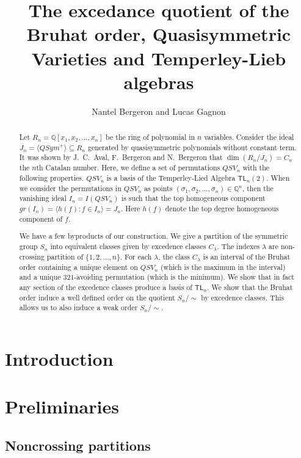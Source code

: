 \documentclass[12pt]{amsart}
\title{The excedance quotient of the Bruhat order, Quasisymmetric Varieties and Temperley-Lieb algebras}
\author{ Nantel Bergeron and Lucas Gagnon}
\date{}
\theoremstyle{definition}
\theoremstyle{remark}
\numberwithin{equation}{section}
\newcommand{\QQ}{\mathbb{Q}}
\newcommand{\TL}{\mathsf{TL}}
\begin{document}
\maketitle
\begin{abstract} Let $R_n=\QQ[x_1,x_2,\ldots,x_n]$ be the ring of polynomial in $n$ variables. Consider the ideal $J_n=\langle QSym^+\rangle\subseteq R_n$ generated by quasisymmetric polynomials
without constant term. It was shown by J.~C.~Aval, F.~Bergeron and  N.~Bergeron that $\dim(R_n/J_n)=C_n$ the $n$th Catalan number. Here, we define a set of permutations $QSV_n$ with the following properties. $QSV_n$ is a basis of the Temperley-Lied Algebra $\TL_n(2)$. When we consider the permutations in $QSV_n$ as points $(\sigma_1,\sigma_2,\ldots,\sigma_n)\in\QQ^n$, 
then the vanishing ideal $I_n=I(QSV_n)$ is such that the top homogeneous component $gr(I_n)=\langle h(f): f\in I_n\rangle=J_n$. Here  $h(f)$ denote the top degree homogeneous component of $f$.

We have a few byproducts of our construction. We give a partition of the symmetric group $S_n$ into equivalent classes given by excedence classes $C_\lambda$. The indexes $\lambda$ are non-crossing partition of $\{1,2,\ldots,n\}$. For each $\lambda$, the class $C_\lambda$ is an interval of the Bruhat order containing a unique element on $QSV_n$ (which is the maximum in the interval) and a unique $321$-avoiding permutation (which is the minimum). We show that in fact any section of the excedence classes produce a basis of $\TL_n$. We show that the Bruhat order induce a well defined order on the quotient $S_n/\!\!\sim$ by excedence classes. This allows us to also induce a weak order $S_n/\!\!\sim$.
\end{abstract}

\section{Introduction}

\section{Preliminaries}

\subsection{Noncrossing partitions}
\label{sec:ncp}
\end{document}
